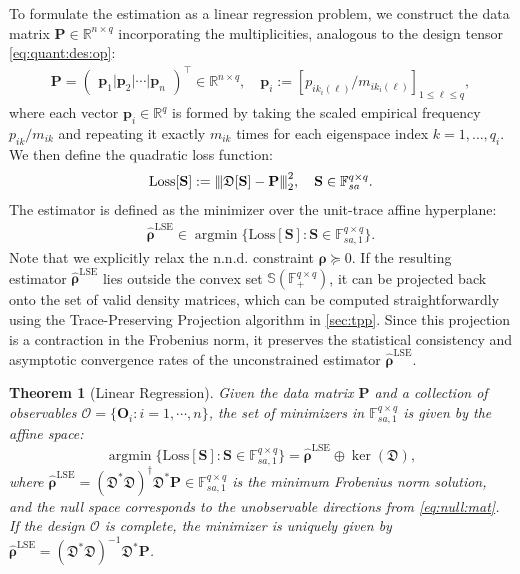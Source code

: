 \documentclass[noinfoline]{imsart}\setcounter{tocdepth}{2}
\renewcommand{\b}[1]{\mathbb{#1}} %
\newcommand{\m}[1]{\mathbf{#1}} %
\newcommand{\s}[1]{\mathscr{#1}} %
\newcommand{\f}[1]{\mathfrak{#1}} %
\newcommand{\mb}[1]{\boldsymbol{#1}} %
\newcommand{\vertiii}[1]{{\left\vert\kern-0.25ex\left\vert\kern-0.25ex\left\vert #1 
    \right\vert\kern-0.25ex\right\vert\kern-0.25ex\right\vert}} %
\DeclareMathOperator*{\argmin}{\arg\min}
\theoremstyle{plain}
\newtheorem{theorem}{Theorem}[section]
\begin{document}
To formulate the estimation as a linear regression problem, we construct the data matrix $\m{P} \in \b{R}^{n \times q}$ incorporating the multiplicities, analogous to the design tensor \eqref{eq:quant:des:op}:
\begin{align*}
    \m{P} = 
    \begin{pmatrix}
        \m{p}_{1} \vert \m{p}_{2} \vert   \cdots \vert \m{p}_{n}
    \end{pmatrix}^{\top} \in \b{R}^{n \times q}, \quad \m{p}_{i} := \left[p_{i k_{i}(\ell)}/m_{i k_{i}(\ell)}  \right]_{1 \le \ell \le q}, 
\end{align*}
where each vector $\m{p}_{i} \in \b{R}^{q}$ is formed by taking the scaled empirical frequency $p_{ik}/m_{ik}$ and repeating it exactly $m_{ik}$ times for each eigenspace index $k = 1, \dots, q_{i}$. We then define the quadratic loss function:
\begin{align}\label{eq:def:loss}
    \mathrm{Loss}[\m{S}] := \vertiii{\f{D}[\m{S}] - \m{P}}_{2}^{2}, \quad \m{S} \in \b{F}_{sa}^{q \times q}.
\end{align}
The estimator is defined as the minimizer over the unit-trace affine hyperplane:
\begin{align}\label{eq:def:density:est}
    \hat{\mb{\rho}}^{\text{LSE}} \in \argmin \{\mathrm{Loss}[\m{S}] : \m{S} \in \b{F}_{sa, 1}^{q \times q}\}.
\end{align}
Note that we explicitly relax the n.n.d. constraint $\mb{\rho} \succeq 0$. If the resulting estimator $\hat{\mb{\rho}}^{\text{LSE}}$ lies outside the convex set $\b{S}(\b{F}_{+}^{q \times q})$, it can be projected back onto the set of valid density matrices, which can be computed straightforwardly using the Trace-Preserving Projection algorithm in \cref{sec:tpp}. Since this projection is a contraction in the Frobenius norm, it preserves the statistical consistency and asymptotic convergence rates of the unconstrained estimator $\hat{\mb{\rho}}^{\text{LSE}}$.

\begin{theorem}[Linear Regression]\label{thm:est:normal:eq}
Given the data matrix $\m{P}$ and a collection of observables $\s{O} = \{\m{O}_{i}: i = 1, \cdots, n\}$, the set of minimizers in $\b{F}_{sa, 1}^{q \times q}$ is given by the affine space:
\begin{equation*}
    \argmin \{\mathrm{Loss}[\m{S}] : \m{S} \in \b{F}_{sa, 1}^{q \times q}\} = \hat{\mb{\rho}}^{\text{LSE}} \oplus \ker(\f{D}),
\end{equation*}
where $\hat{\mb{\rho}}^{\text{LSE}} = (\f{D}^{*} \f{D})^{\dagger} \f{D}^{*} \m{P} \in \b{F}_{sa, 1}^{q \times q}$ is the minimum Frobenius norm solution, and the null space corresponds to the unobservable directions from \eqref{eq:null:mat}. If the design $\s{O}$ is complete, the minimizer is uniquely given by $\hat{\mb{\rho}}^{\text{LSE}} = (\f{D}^{*} \f{D})^{-1} \f{D}^{*} \m{P}$.
\end{theorem}
\end{document}
